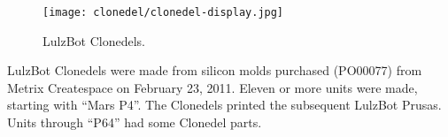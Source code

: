 %
%
%
%
%

\begin{figure}[h!]
\texttt{[image: clonedel/clonedel-display.jpg]}
 \caption{LulzBot Clonedels.}
 \label{fig:clonedel-clonedel-display}
\end{figure}

LulzBot Clonedels were made from silicon molds purchased (PO00077)
from Metrix Createspace on February 23, 2011. Eleven or more units were made,
starting with ``Mars P4''. The Clonedels printed the subsequent LulzBot Prusas.
Units through ``P64'' had some Clonedel parts.














